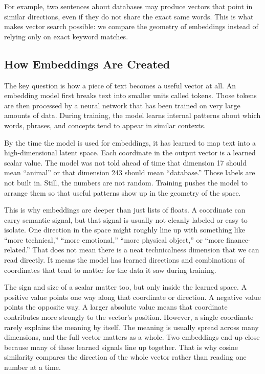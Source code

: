 \documentclass[12pt]{article}
\begin{document}
For example, two sentences about databases may produce vectors that point
in similar directions, even if they do not share the exact same words.
This is what makes vector search possible: we compare the geometry of
embeddings instead of relying only on exact keyword matches.

\subsection{How Embeddings Are Created}

The key question is how a piece of text becomes a useful vector at all.
An embedding model first breaks text into smaller units called tokens.
Those tokens are then processed by a neural network that has been trained
on very large amounts of data. During training, the model learns internal
patterns about which words, phrases, and concepts tend to appear in
similar contexts.

By the time the model is used for embeddings, it has learned to map text
into a high-dimensional latent space. Each coordinate in the output vector
is a learned scalar value. The model was not told ahead of time that
dimension 17 should mean ``animal'' or that dimension 243 should mean
``database.'' Those labels are not built in. Still, the numbers are not
random. Training pushes the model to arrange them so that useful patterns
show up in the geometry of the space.

This is why embeddings are deeper than just lists of floats. A coordinate
can carry semantic signal, but that signal is usually not cleanly labeled
or easy to isolate. One direction in the space might roughly line up with
something like ``more technical,'' ``more emotional,'' ``more physical
object,'' or ``more finance-related.'' That does not mean there is a neat
technicalness dimension that we can read directly. It means the model has
learned directions and combinations of coordinates that tend to matter for
the data it saw during training.

The sign and size of a scalar matter too, but only inside the learned
space. A positive value points one way along that coordinate or direction.
A negative value points the opposite way. A larger absolute value means
that coordinate contributes more strongly to the vector's position.
However, a single coordinate rarely explains the meaning by itself. The
meaning is usually spread across many dimensions, and the full vector
matters as a whole. Two embeddings end up close because many of these
learned signals line up together. That is why cosine similarity compares
the direction of the whole vector rather than reading one number at a
time.
\end{document}
